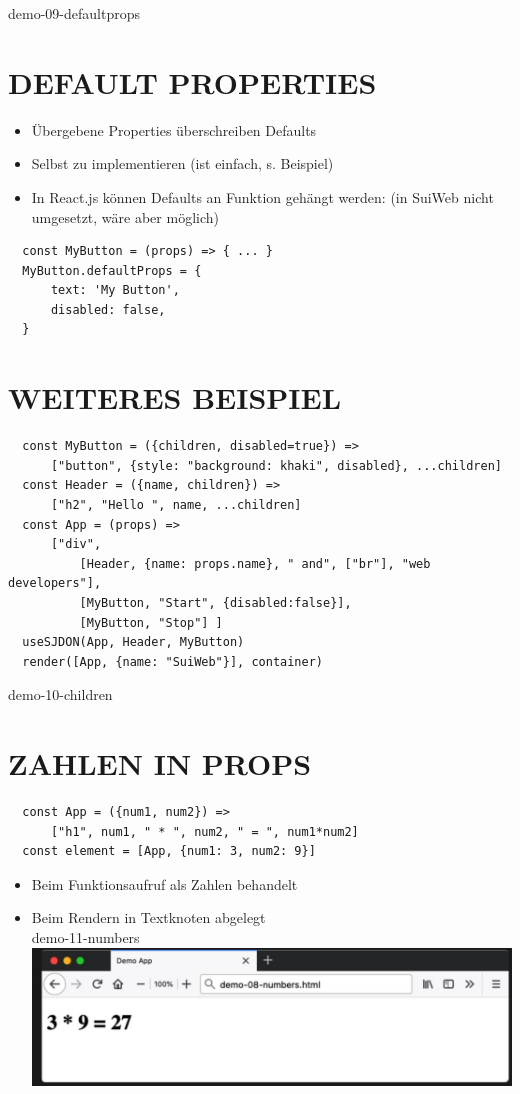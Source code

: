   demo-09-defaultprops
  
  \section*{DEFAULT PROPERTIES}
  \begin{itemize}
    \item Übergebene Properties überschreiben Defaults
    \item Selbst zu implementieren (ist einfach, s. Beispiel)
    \item In React.js können Defaults an Funktion gehängt werden: (in SuiWeb nicht umgesetzt, wäre aber möglich)
  \end{itemize}
  
  \begin{verbatim}
  const MyButton = (props) => { ... }
  MyButton.defaultProps = {
      text: 'My Button',
      disabled: false,
  }
  \end{verbatim}
  
  \section*{WEITERES BEISPIEL}
  \begin{verbatim}
  const MyButton = ({children, disabled=true}) =>
      ["button", {style: "background: khaki", disabled}, ...children]
  const Header = ({name, children}) =>
      ["h2", "Hello ", name, ...children]
  const App = (props) =>
      ["div",
          [Header, {name: props.name}, " and", ["br"], "web developers"],
          [MyButton, "Start", {disabled:false}],
          [MyButton, "Stop"] ]
  useSJDON(App, Header, MyButton)
  render([App, {name: "SuiWeb"}], container)
  \end{verbatim}
  
  demo-10-children
  
  \section*{ZAHLEN IN PROPS}
  \begin{verbatim}
  const App = ({num1, num2}) =>
      ["h1", num1, " * ", num2, " = ", num1*num2]
  const element = [App, {num1: 3, num2: 9}]
  \end{verbatim}
  
  \begin{itemize}
    \item Beim Funktionsaufruf als Zahlen behandelt
    \item Beim Rendern in Textknoten abgelegt\\
  demo-11-numbers\\
  \includegraphics[width=\linewidth]{images/2025_01_02_254b5e4c52d090c313e1g-40}
  \end{itemize}
  
